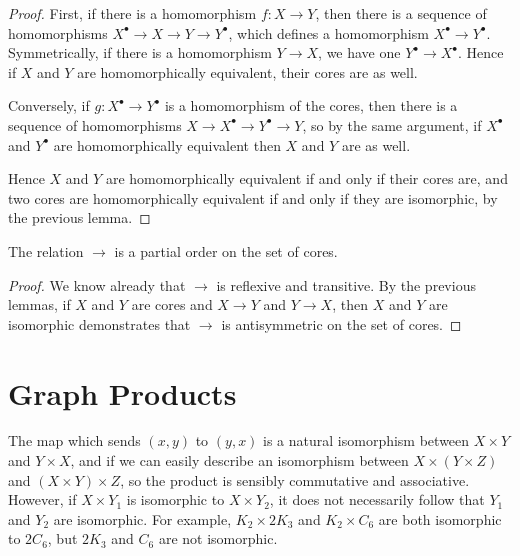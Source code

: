 \begin{proof}
	First, if there is a homomorphism $f:X\rightarrow Y$, then there is a sequence of homomorphisms $X^\bullet\rightarrow X\rightarrow Y \rightarrow Y^\bullet$, which defines a homomorphism $X^\bullet\rightarrow Y^\bullet$.  Symmetrically, if there is a homomorphism $Y\rightarrow X$, we have one $Y^\bullet \rightarrow X^\bullet$.  Hence if $X$ and $Y$ are homomorphically equivalent, their cores are as well.
	
	Conversely, if $g:X^\bullet\rightarrow Y^\bullet$ is a homomorphism of the cores, then there is a sequence of homomorphisms $X\rightarrow X^\bullet \rightarrow Y^\bullet\rightarrow Y$, so by the same argument, if $X^\bullet$ and $Y^\bullet$ are homomorphically equivalent then $X$ and $Y$ are as well.
	
	Hence $X$ and $Y$ are homomorphically equivalent if and only if their cores are, and two cores are homomorphically equivalent if and only if they are isomorphic, by the previous lemma.
\end{proof}
\begin{corollary}
	The relation $\rightarrow$ is a partial order on the set of cores.
\end{corollary}
\begin{proof}
	We know already that $\rightarrow$ is reflexive and transitive.  By the previous lemmas, if $X$ and $Y$ are cores and $X\rightarrow Y$ and $Y\rightarrow X$, then $X$ and $Y$ are isomorphic demonstrates that $\rightarrow$ is antisymmetric on the set of cores.
\end{proof}


\section*{Graph Products}


The map which sends $(x,y)$ to $(y,x)$ is a natural isomorphism between $X\times Y$ and $Y\times X$, and if we can easily describe an isomorphism between $X\times (Y\times Z)$ and $(X\times Y)\times Z$, so the product is sensibly commutative and associative.  However, if $X\times Y_1$ is isomorphic to $X\times Y_2$, it does not necessarily follow that $Y_1$ and $Y_2$ are isomorphic.  For example, $K_2\times 2K_3$ and $K_2\times C_6$ are both isomorphic to $2C_6$, but $2K_3$ and $C_6$ are not isomorphic.

